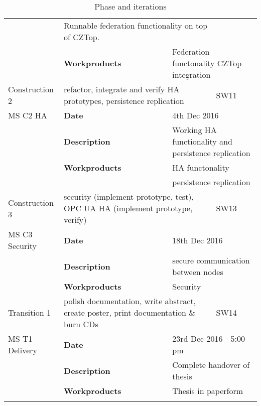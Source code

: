 \begin{center}
\begin{longtable}{|p{25mm}|p{25mm} p{45mm}|p{10mm}|}
		& \multicolumn{2}{l|}{Runnable federation functionality on top of CZTop.} \\
		& \textbf{Workproducts}
		& \multicolumn{2}{l|}{Federation functonality CZTop integration} \\ \hline
	Construction 2
		& \multicolumn{2}{p{70mm}|}{refactor, integrate and verify HA prototypes, persistence replication}
		& SW11 \\ \hline
	MS C2 HA
		& \textbf{Date}
		& \multicolumn{2}{l|}{4th Dec 2016} \\
		& \textbf{Description}
		& \multicolumn{2}{l|}{Working HA functionality and persistence replication} \\
		& \textbf{Workproducts}
		& \multicolumn{2}{l|}{HA functonality} \\
		& & \multicolumn{2}{l|}{persistence replication} \\ \hline
	Construction 3
		& \multicolumn{2}{p{70mm}|}{security (implement prototype, test), OPC UA HA (implement prototype, verify)}
		& SW13 \\ \hline
	MS C3 Security
		& \textbf{Date}
		& \multicolumn{2}{l|}{18th Dec 2016} \\
		& \textbf{Description}
		& \multicolumn{2}{l|}{secure communication between nodes} \\
		& \textbf{Workproducts}
		& \multicolumn{2}{l|}{Security} \\ \hline
	Transition 1
		& \multicolumn{2}{p{70mm}|}{polish documentation, write abstract, create poster, print documentation \& burn CDs}
		& SW14 \\ \hline
	MS T1 Delivery
		& \textbf{Date}
		& \multicolumn{2}{l|}{23rd Dec 2016 - 5:00 pm} \\
		& \textbf{Description}
		& \multicolumn{2}{l|}{Complete handover of thesis} \\
		& \textbf{Workproducts}
		& \multicolumn{2}{l|}{Thesis in paperform} \\ \hline

   \caption{Phase and iterations} \label{tab:phases}
   \end{longtable}
\end{center}
